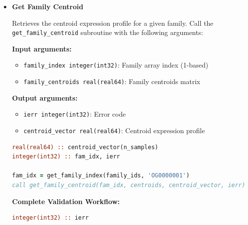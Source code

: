 \documentclass[11pt]{article}
\begin{document}
\begin{enumerate}
\begin{itemize}
\begin{itemize}
	      	      	\item \texttt{ierr integer(int32)}: Error code
	      	      \end{itemize}
	      	      \begin{lstlisting}[language=Fortran, caption={Get Family for Gene}]
integer(int32) :: gene_idx, fam_idx, ierr

gene_idx = get_gene_index(gene_ids, 'NP_001000001.1')
call get_family_for_gene_index(gene_idx, gene_to_fam, fam_idx, ierr)
	      	      \end{lstlisting}
	      	      
	      	\item \textbf{Get Family Centroid}
	      	      
	      	      Retrieves the centroid expression profile for a given family. Call the
	      	      \texttt{get\_family\_centroid} subroutine with the following arguments:
	      	      
	      	      \textbf{Input arguments:}
	      	      \begin{itemize}
	      	      	\item \texttt{family\_index integer(int32)}: Family array index (1-based)
	      	      	      
	      	      	\item \texttt{family\_centroids real(real64)}: Family centroids matrix
	      	      \end{itemize}
	      	      \textbf{Output arguments:}
	      	      \begin{itemize}
	      	      	\item \texttt{ierr integer(int32)}: Error code
	      	      	      
	      	      	\item \texttt{centroid\_vector real(real64)}: Centroid expression profile
	      	      \end{itemize}
	      	      \begin{lstlisting}[language=Fortran, caption={Get Family Centroid}]
real(real64) :: centroid_vector(n_samples)
integer(int32) :: fam_idx, ierr

fam_idx = get_family_index(family_ids, 'OG0000001')
call get_family_centroid(fam_idx, centroids, centroid_vector, ierr)
	      	      \end{lstlisting}
	      	      
	      	      \textbf{Complete Validation Workflow:} 
	      	      \begin{lstlisting}[language=Fortran, caption={Complete Data Validation Workflow}]
integer(int32) :: ierr


\end{lstlisting}
\end{itemize}
\end{enumerate}
\end{document}
